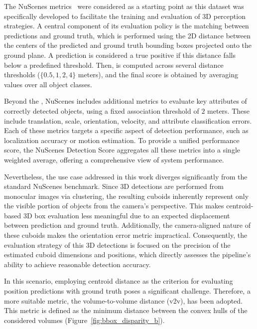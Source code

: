  \label{sec:3d_det_evaluation}

The NuScenes metrics~\cite{nuscenes} were considered as a starting point as this dataset was specifically developed to facilitate the training and evaluation of 3D perception strategies. A central component of its evaluation policy is the matching between predictions and ground truth, which is performed using the 2D distance between the centers of the predicted and ground truth bounding boxes projected onto the ground plane. A prediction is considered a true positive if this distance falls below a predefined threshold. Then,  is computed across several distance thresholds ($\{0.5, 1, 2, 4\}$ meters), and the final  score is obtained by averaging  values over all object classes.

Beyond the , NuScenes includes additional metrics to evaluate key attributes of correctly detected objects, using a fixed association threshold of $2$ meters. These include translation, scale, orientation, velocity, and attribute classification errors. Each of these metrics targets a specific aspect of detection performance, such as localization accuracy or motion estimation. To provide a unified performance score, the NuScenes Detection Score aggregates all these metrics into a single weighted average, offering a comprehensive view of system performance.

Nevertheless, the use case addressed in this work diverges significantly from the standard NuScenes benchmark. Since 3D detections are performed from monocular images via clustering, the resulting cuboids inherently represent only the visible portion of objects from the camera's perspective. This makes centroid-based 3D box evaluation less meaningful due to an expected displacement between prediction and ground truth. Additionally, the camera-aligned nature of these cuboids makes the orientation error metric impractical. Consequently, the evaluation strategy of this 3D detections is focused on the precision of the estimated cuboid dimensions and positions, which directly assesses the pipeline's ability to achieve reasonable detection accuracy.

In this scenario, employing centroid distance as the criterion for evaluating position predictions with ground truth poses a significant challenge. Therefore, a more suitable metric, the volume-to-volume distance (v2v), has been adopted. This metric is defined as the minimum distance between the convex hulls of the considered volumes (Figure~\ref{fig:bbox_disparity_b}).


